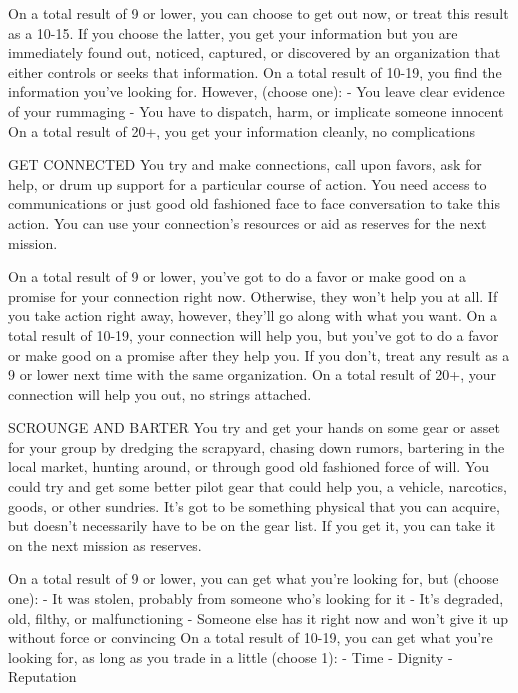 On a total result of 9 or lower, you can choose to get out now, or treat this result as a 10-15. If you
choose the latter, you get your information but you are immediately found out, noticed, captured,
or discovered by an organization that either controls or seeks that information.
On a total result of 10-19, you find the information you’ve looking for. However, (choose one):
    -    You leave clear evidence of your rummaging
    -    You have to dispatch, harm, or implicate someone innocent
On a total result of 20+, you get your information cleanly, no complications

GET CONNECTED
You try and make connections, call upon favors, ask for help, or drum up support for a particular
course of action. You need access to communications or just good old fashioned face to face
conversation to take this action. You can use your connection’s resources or aid as reserves for
the next mission.

On a total result of 9 or lower, you’ve got to do a favor or make good on a promise for your
connection right now. Otherwise, they won’t help you at all. If you take action right away, however,
they’ll go along with what you want.
On a total result of 10-19, your connection will help you, but you’ve got to do a favor or make good
on a promise after they help you. If you don’t, treat any result as a 9 or lower next time with the
same organization.
On a total result of 20+, your connection will help you out, no strings attached.

SCROUNGE AND BARTER
You try and get your hands on some gear or asset for your group by dredging the scrapyard,
chasing down rumors, bartering in the local market, hunting around, or through good old
fashioned force of will. You could try and get some better pilot gear that could help you, a vehicle,
narcotics, goods, or other sundries. It’s got to be something physical that you can acquire, but
doesn’t necessarily have to be on the gear list. If you get it, you can take it on the next mission as
reserves.

On a total result of 9 or lower, you can get what you’re looking for, but (choose one):
    -    It was stolen, probably from someone who’s looking for it
    -    It’s degraded, old, filthy, or malfunctioning
    -    Someone else has it right now and won’t give it up without force or convincing
On a total result of 10-19, you can get what you’re looking for, as long as you trade in a little
(choose 1):
    -    Time
    -    Dignity
    -    Reputation




